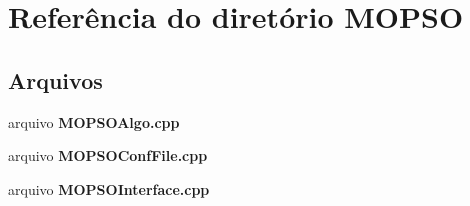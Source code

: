 \section{Referência do diretório M\+O\+P\+SO}
\label{dir_d9b5bc37578e0cc1ea6b66131a40d7b3}
\subsection*{Arquivos}
\begin{DoxyCompactItemize}
\item 
arquivo {\bf M\+O\+P\+S\+O\+Algo.\+cpp}
\item 
arquivo {\bf M\+O\+P\+S\+O\+Conf\+File.\+cpp}
\item 
arquivo {\bf M\+O\+P\+S\+O\+Interface.\+cpp}
\end{DoxyCompactItemize}
